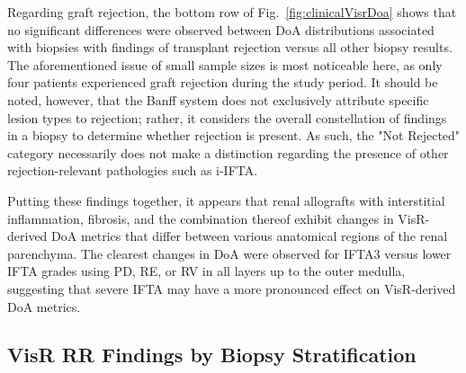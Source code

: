 Regarding graft rejection, the bottom row of Fig.~\ref{fig:clinicalVisrDoa} shows that no significant differences were observed between DoA distributions associated with biopsies with findings of transplant rejection versus all other biopsy results. The aforementioned issue of small sample sizes is most noticeable here, as only four patients experienced graft rejection during the study period. It should be noted, however, that the Banff system does not exclusively attribute specific lesion types to rejection; rather, it considers the overall constellation of findings in a biopsy to determine whether rejection is present. As such, the "Not Rejected" category necessarily does not make a distinction regarding the presence of other rejection-relevant pathologies such as i-IFTA.

Putting these findings together, it appears that renal allografts with interstitial inflammation, fibrosis, and the combination thereof exhibit changes in VisR-derived DoA metrics that differ between various anatomical regions of the renal parenchyma. The clearest changes in DoA were observed for IFTA3 versus lower IFTA grades using PD, RE, or RV in all layers up to the outer medulla, suggesting that severe IFTA may have a more pronounced effect on VisR-derived DoA metrics. 

\subsection{VisR RR Findings by Biopsy Stratification}

